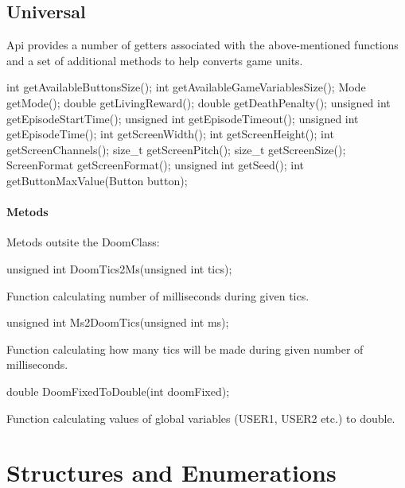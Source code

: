 \vspace{20pt}
\subsection{Universal}


Api provides a number of getters associated with the above-mentioned functions and a set of additional methods to help converts game units.
  

\vspace{20pt}
\begin{clinee}
int getAvailableButtonsSize();
int getAvailableGameVariablesSize();
Mode getMode();
double getLivingReward();
double getDeathPenalty();
unsigned int getEpisodeStartTime();
unsigned int getEpisodeTimeout();
unsigned int getEpisodeTime();
int getScreenWidth();
int getScreenHeight();
int getScreenChannels();
size_t getScreenPitch();
size_t getScreenSize();
ScreenFormat getScreenFormat();
unsigned int getSeed();
int getButtonMaxValue(Button button);
\end{clinee}


\paragraph {Metods} Metods outsite the DoomClass:


\begin{clinee}
unsigned int DoomTics2Ms(unsigned int tics);
\end{clinee}

Function calculating number of milliseconds during given tics.


\vspace{20pt}
\begin{clinee}
unsigned int Ms2DoomTics(unsigned int ms);
\end{clinee}

Function calculating how many tics will be made during given number of milliseconds.


\vspace{20pt}
\begin{clinee}
double DoomFixedToDouble(int doomFixed);
\end{clinee}

Function calculating values of global variables (USER1, USER2 etc.) to double.


\vspace{20pt}
\section{Structures and Enumerations} \label{sec:structs}
